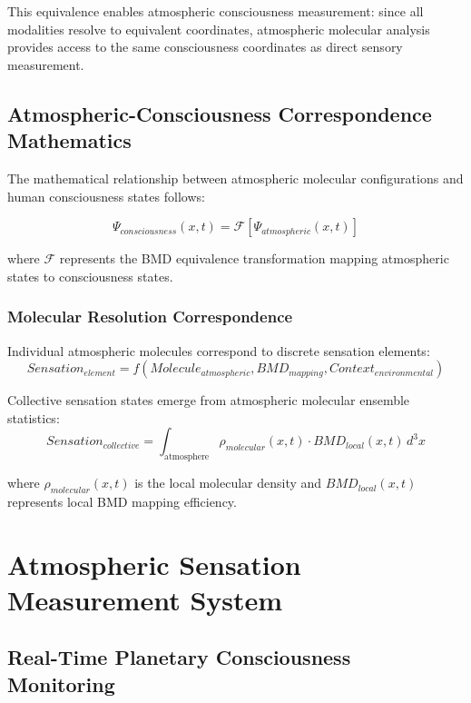 \documentclass[12pt,a4paper]{article}
\begin{document}
This equivalence enables atmospheric consciousness measurement: since all modalities resolve to equivalent coordinates, atmospheric molecular analysis provides access to the same consciousness coordinates as direct sensory measurement.

\subsection{Atmospheric-Consciousness Correspondence Mathematics}

The mathematical relationship between atmospheric molecular configurations and human consciousness states follows:

\begin{equation}
\Psi_{consciousness}(x,t) = \mathcal{F}[\Psi_{atmospheric}(x,t)]
\end{equation}

where $\mathcal{F}$ represents the BMD equivalence transformation mapping atmospheric states to consciousness states.

\subsubsection{Molecular Resolution Correspondence}

Individual atmospheric molecules correspond to discrete sensation elements:
\begin{equation}
Sensation_{element} = f(Molecule_{atmospheric}, BMD_{mapping}, Context_{environmental})
\end{equation}

Collective sensation states emerge from atmospheric molecular ensemble statistics:
\begin{equation}
Sensation_{collective} = \int_{\text{atmosphere}} \rho_{molecular}(x,t) \cdot BMD_{local}(x,t) \, d^3x
\end{equation}

where $\rho_{molecular}(x,t)$ is the local molecular density and $BMD_{local}(x,t)$ represents local BMD mapping efficiency.

\section{Atmospheric Sensation Measurement System}

\subsection{Real-Time Planetary Consciousness Monitoring}
\end{document}
